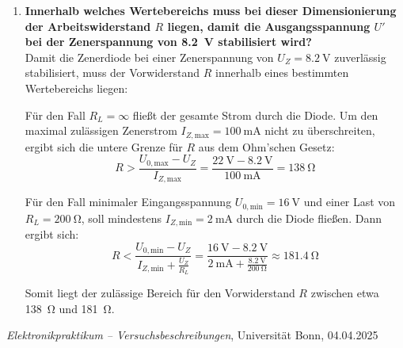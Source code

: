 \documentclass{article}
\begin{document}
\begin{enumerate}[label=\textbf{(\Alph*)}]
    \item \textbf{Innerhalb welches Wertebereichs muss bei dieser Dimensionierung der Arbeitswiderstand $R$ liegen, damit die Ausgangsspannung $U'$ bei der Zenerspannung von \SI{8.2}{\volt} stabilisiert wird?}
   \\ Damit die Zenerdiode bei einer Zenerspannung von \( U_Z = \SI{8.2}{\volt} \) zuverlässig stabilisiert, muss der Vorwiderstand \( R \) innerhalb eines bestimmten Wertebereichs liegen:

Für den Fall \( R_L = \infty \) fließt der gesamte Strom durch die Diode. Um den maximal zulässigen Zenerstrom \( I_{Z,\text{max}} = \SI{100}{\milli\ampere} \) nicht zu überschreiten, ergibt sich die untere Grenze für \( R \) aus dem Ohm’schen Gesetz:
\[
R > \frac{U_{0,\text{max}} - U_Z}{I_{Z,\text{max}}} = \frac{\SI{22}{\volt} - \SI{8.2}{\volt}}{\SI{100}{\milli\ampere}} = \SI{138}{\ohm}
\]

Für den Fall minimaler Eingangsspannung \( U_{0,\text{min}} = \SI{16}{\volt} \) und einer Last von \( R_L = \SI{200}{\ohm} \), soll mindestens \( I_{Z,\text{min}} = \SI{2}{\milli\ampere} \) durch die Diode fließen. Dann ergibt sich:
\[
R < \frac{U_{0,\text{min}} - U_Z}{I_{Z,\text{min}} + \frac{U_Z}{R_L}} = \frac{\SI{16}{\volt} - \SI{8.2}{\volt}}{\SI{2}{\milli\ampere} + \frac{\SI{8.2}{\volt}}{\SI{200}{\ohm}}} \approx \SI{181.4}{\ohm}
\]

Somit liegt der zulässige Bereich für den Vorwiderstand \( R \) zwischen etwa \SI{138}{\ohm} und \SI{181}{\ohm}.

\end{enumerate}




        \begin{thebibliography}{9}
        
        \textit{Elektronikpraktikum -- Versuchsbeschreibungen}, Universität Bonn, 04.04.2025
        
        
        \end{thebibliography}
\end{document}
